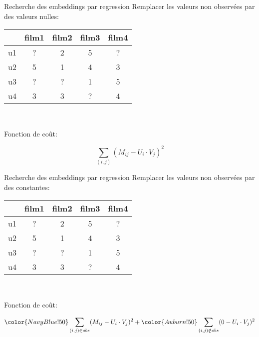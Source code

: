 \begin{frame}{Recherche des embeddings par regression}
  Remplacer les valeurs non observées par des valeurs nulles:
  \begin{center}
    \begin{tabular}{|l|c|c|c|c|}
      \hline
      & film1 & film2 & film3 & film4 \\
      \hline
      u1 & \cellcolor{NavyBlue!30}? & \cellcolor{NavyBlue!30}2 & \cellcolor{NavyBlue!30}5 & \cellcolor{NavyBlue!30}? \\
      \hline
      u2 & \cellcolor{NavyBlue!30}5 & \cellcolor{NavyBlue!30}1 & \cellcolor{NavyBlue!30}4 & \cellcolor{NavyBlue!30}3 \\
      \hline
      u3 & \cellcolor{NavyBlue!30}? & \cellcolor{NavyBlue!30}? & \cellcolor{NavyBlue!30}1 & \cellcolor{NavyBlue!30}5 \\
      \hline
      u4 & \cellcolor{NavyBlue!30}3 & \cellcolor{NavyBlue!30}3 & \cellcolor{NavyBlue!30}? & \cellcolor{NavyBlue!30}4 \\
    \hline
    \end{tabular}\\
    \end{center}

  \alert{Fonction de coût}:

  $$\sum_{(i,j)}(M_{ij} - U_i\cdot V_j)^2$$
\end{frame}

\begin{frame}{Recherche des embeddings par regression}
  Remplacer les valeurs non observées par des constantes:
  \begin{center}
    \begin{tabular}{|l|c|c|c|c|}
      \hline
      & film1 & film2 & film3 & film4 \\
      \hline
      u1 & \cellcolor{Auburn!30}? & \cellcolor{NavyBlue!30}2 & \cellcolor{NavyBlue!30}5 & \cellcolor{Auburn!30}? \\
      \hline
      u2 & \cellcolor{NavyBlue!30}5 & \cellcolor{NavyBlue!30}1 & \cellcolor{NavyBlue!30}4 & \cellcolor{NavyBlue!30}3 \\
      \hline
      u3 & \cellcolor{Auburn!30}? & \cellcolor{Auburn!30}? & \cellcolor{NavyBlue!30}1 & \cellcolor{NavyBlue!30}5 \\
      \hline
      u4 & \cellcolor{NavyBlue!30}3 & \cellcolor{NavyBlue!30}3 & \cellcolor{Auburn!30}? & \cellcolor{NavyBlue!30}4 \\
    \hline
    \end{tabular}\\
    \end{center}

  \alert{Fonction de coût}:

  $${\color{NavyBlue!50}\sum_{(i,j) \in obs}(M_{ij} - U_i\cdot V_j)^2} + {\color{Auburn!50}\sum_{(i,j) \notin obs}(0 - U_i\cdot V_j)^2} $$
\end{frame}


